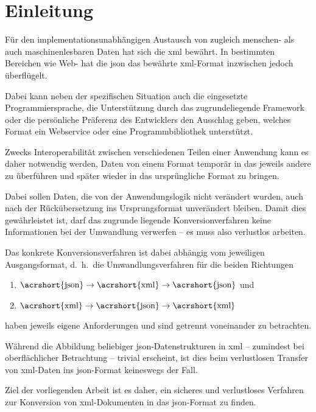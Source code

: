 \chapter{Einleitung} \label{chap:intro}

Für den implementationsunabhängigen Austausch von zugleich menschen- als auch
maschinenlesbaren Daten hat sich die \gls{xml}
bewährt. In bestimmten Bereichen wie Web- hat die \gls{json}
das bewährte \acrshort{xml}-Format inzwischen jedoch überflügelt.

Dabei kann neben der spezifischen Situation auch die eingesetzte
Programmiersprache, die Unterstützung durch das zugrundeliegende Framework
oder die persönliche Präferenz des Entwicklers den Ausschlag geben, welches
Format ein Webservice oder eine Programmbibliothek unterstützt.

Zwecks Interoperabilität zwischen verschiedenen Teilen einer Anwendung kann es
daher notwendig werden, Daten von einem Format temporär in das jeweils andere
zu überführen und später wieder in das ursprüngliche Format zu bringen.

Dabei sollen Daten, die von der Anwendungslogik nicht verändert wurden, auch
nach der Rückübersetzung ins Ursprungsformat unverändert bleiben. Damit dies
gewährleistet ist, darf das zugrunde liegende Konversionverfahren keine
Informationen bei der Umwandlung verwerfen -- es muss also verlustlos %
arbeiten.

Das konkrete Konversionsverfahren ist dabei abhängig vom jeweiligen
Ausgangsformat, d.~h.\ die Umwandlungsverfahren für die beiden Richtungen
\begin{enumerate}
    \item $\text{\acrshort{json}} \rightarrow \text{\acrshort{xml}} \rightarrow \text{\acrshort{json}}$ und
    \item $\text{\acrshort{xml}} \rightarrow \text{\acrshort{json}} \rightarrow \text{\acrshort{xml}}$
\end{enumerate}
haben jeweils eigene Anforderungen und sind getrennt voneinander zu betrachten.

Während die Abbildung beliebiger \acrshort{json}-Datenstrukturen in \acrshort{xml} -- zumindest bei
oberflächlicher Betrachtung -- trivial erscheint, ist dies beim verlustlosen
Transfer von \acrshort{xml}-Daten ins \acrshort{json}-Format keineswegs der Fall.

Ziel der vorliegenden Arbeit ist es daher, ein sicheres und verlustloses
Verfahren zur Konversion von \acrshort{xml}-Dokumenten in das \acrshort{json}-Format zu finden.

